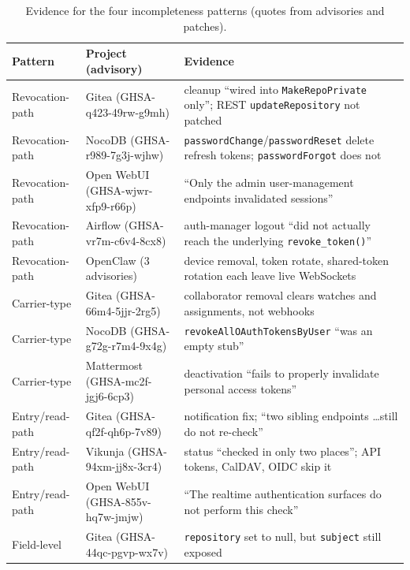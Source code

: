\documentclass[preprint,12pt]{elsarticle}
\begin{document}
\begin{table}[t]
\centering\small
\caption{Evidence for the four incompleteness patterns (quotes from advisories and patches).}
\label{tab:rq4}
\footnotesize
\begin{tabularx}{\linewidth}{@{}l>{\raggedright\arraybackslash}p{3.3cm}>{\raggedright\arraybackslash}X@{}}
\toprule
Pattern & Project (advisory) & Evidence \\
\midrule
Revocation-path & Gitea (GHSA-q423-49rw-g9mh) & cleanup ``wired into \texttt{MakeRepoPrivate} only''; REST \texttt{updateRepository} not patched \\
Revocation-path & NocoDB (GHSA-r989-7g3j-wjhw) & \texttt{passwordChange}/\texttt{passwordReset} delete refresh tokens; \texttt{passwordForgot} does not \\
Revocation-path & Open WebUI (GHSA-wjwr-xfp9-r66p) & ``Only the admin user-management endpoints invalidated sessions'' \\
Revocation-path & Airflow (GHSA-vr7m-c6v4-8cx8) & auth-manager logout ``did not actually reach the underlying \texttt{revoke\_token()}'' \\
Revocation-path & OpenClaw (3 advisories) & device removal, token rotate, shared-token rotation each leave live WebSockets \\
Carrier-type & Gitea (GHSA-66m4-5jjr-2rg5) & collaborator removal clears watches and assignments, not webhooks \\
Carrier-type & NocoDB (GHSA-g72g-r7m4-9x4g) & \texttt{revokeAllOAuthTokensByUser} ``was an empty stub'' \\
Carrier-type & Mattermost (GHSA-mc2f-jgj6-6cp3) & deactivation ``fails to properly invalidate personal access tokens'' \\
Entry/read-path & Gitea (GHSA-qf2f-qh6p-7v89) & notification fix; ``two sibling endpoints \ldots still do not re-check'' \\
Entry/read-path & Vikunja (GHSA-94xm-jj8x-3cr4) & status ``checked in only two places''; API tokens, CalDAV, OIDC skip it \\
Entry/read-path & Open WebUI (GHSA-855v-hq7w-jmjw) & ``The realtime authentication surfaces do not perform this check'' \\
Field-level & Gitea (GHSA-44qc-pgvp-wx7v) & \texttt{repository} set to null, but \texttt{subject} still exposed \\
\bottomrule
\end{tabularx}
\end{table}
\end{document}
